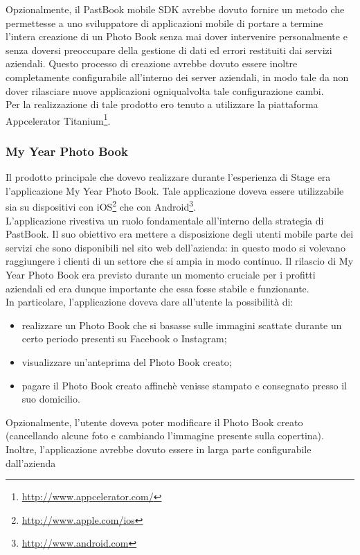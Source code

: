 				Opzionalmente, il PastBook mobile SDK avrebbe dovuto fornire un metodo che permettesse a uno sviluppatore
				di applicazioni mobile di portare a termine l'intera creazione di un Photo Book senza mai dover intervenire
				personalmente e senza doversi preoccupare della gestione di dati ed errori restituiti dai servizi aziendali. Questo
				processo di creazione avrebbe dovuto essere inoltre completamente configurabile all'interno dei server aziendali, in
				modo tale da non dover rilasciare nuove applicazioni ogniqualvolta tale configurazione cambi.\\
				Per la realizzazione di tale prodotto ero tenuto a utilizzare la piattaforma
				Appcelerator Titanium\footnote{\url{http://www.appcelerator.com/}}.
			\subsubsection{My Year Photo Book}
				Il prodotto principale che dovevo realizzare durante l'esperienza di Stage era l'applicazione My Year Photo Book.
				Tale applicazione doveva essere utilizzabile sia su dispositivi con iOS\footnote{\url{http://www.apple.com/ios}} che
				con Android\footnote{\url{http://www.android.com}}.\\
				L'applicazione rivestiva un ruolo fondamentale all'interno della strategia di PastBook. Il suo obiettivo era
				mettere a disposizione degli utenti mobile parte dei servizi che sono disponibili nel sito web dell'azienda: in
				questo modo si volevano raggiungere i clienti di un settore che si ampia in modo continuo. Il rilascio di My Year
				Photo Book era previsto durante un momento cruciale per i profitti aziendali ed era dunque importante che essa fosse
				stabile e funzionante.\\
				In particolare, l'applicazione doveva dare all'utente la possibilità di:
				\begin{itemize}
					\item realizzare un Photo Book che si basasse sulle immagini scattate durante un certo periodo presenti
					su Facebook o Instagram;
					\item visualizzare un'anteprima del Photo Book creato;
					\item pagare il Photo Book creato affinchè venisse stampato e consegnato presso il suo domicilio.
				\end{itemize}
				Opzionalmente, l'utente doveva poter modificare il Photo Book creato (cancellando alcune foto e cambiando l'immagine
				presente sulla copertina). Inoltre, l'applicazione avrebbe dovuto essere in larga parte configurabile dall'azienda

